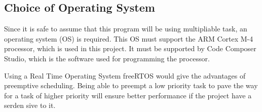 \subsection{Choice of Operating System}
\label{sec:ChoiceofOperatingSystem}

Since it is safe to assume that this program will be using multipliable task, an operating system (OS) is required. This OS must support the ARM Cortex M-4 processor, which is used in this project. It must be supported by Code Composer Studio, which is the software used for programming the processor. 

Using a Real Time Operating System freeRTOS would give the advantages of preemptive scheduling. Being able to preempt a low priority task to pave the way for a task of higher priority will ensure better performance if the project have a serden sive to it. 


 